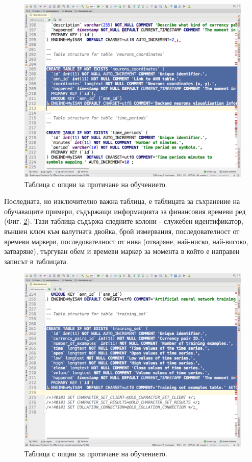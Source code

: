 \documentclass[book,14pt,oneside,openany]{memoir}
\begin{document}
\begin{figure}[h]
  \centering
  \includegraphics[height=0.45\pdfpageheight]{pic0102}
  \caption{Таблица с опции за протичане на обучението.}
\label{fig:pic0102}
\end{figure}
\FloatBarrier

Последната, но изключително важна таблица, е таблицата за съхранение на обучаващите примери, съдържащи информацията за финансовия времеви ред (Фиг. \ref{fig:pic0103}). Тази таблица съдържа следните колони - служебен идентификатор, външен ключ към валутната двойка, брой измервания, последователност от времеви маркери, последователност от нива (отваряне, най-ниско, най-високо, затваряне), търгуван обем и времеви маркер за момента в който е направен записът в таблицата. 

\begin{figure}[h]
  \centering
  \includegraphics[height=0.45\pdfpageheight]{pic0103}
  \caption{Таблица с опции за протичане на обучението.}
\label{fig:pic0103}
\end{figure}
\FloatBarrier
\end{document}
